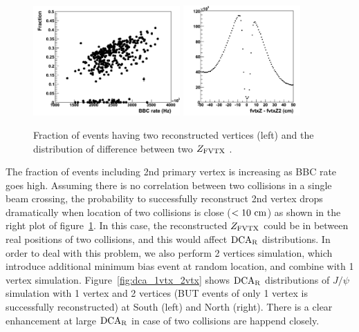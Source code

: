 \documentclass[12pt]{article}
\newcommand{\jpsi}{$J/\psi$ }
\newcommand{\dcar}{$\rm{DCA}_{R}$ }
\newcommand{\fvtxz}{$Z_{\rm FVTX}$ }
\begin{document}
\begin{figure}[!h]
\begin{center}
\includegraphics[width=0.5\textwidth,angle=0]{figures/Fraction_2nd_vertex_BBCrate}
\includegraphics[width=0.4\textwidth,angle=0]{figures/FvtxZ_diff_1st_2nd}
\\ \caption{Fraction of events having two reconstructed vertices (left) and the distribution of difference between two \fvtxz.}
\label{fig:FvtxZ_2nd}
\end{center}
\end{figure}


The fraction of events including 2nd primary vertex is increasing as BBC rate goes high.
Assuming there is no correlation between two collisions in a single beam crossing, the probability to successfully reconstruct 2nd vertex drops dramatically when location of two collisions is close ($<10~{\rm cm}$) as shown in the right plot of figure~\ref{fig:FvtxZ_2nd}.
In this case, the reconstructed \fvtxz could be in between real positions of two collisions, and this would affect \dcar distributions.
In order to deal with this problem, we also perform 2 vertices simulation, which introduce additional minimum bias event at random location, and combine with 1 vertex simulation.
Figure~\ref{fig:dca_1vtx_2vtx} shows \dcar distributions of \jpsi simulation with 1 vertex and 2 vertices (BUT events of only 1 vertex is successfully reconstructed) at South (left) and North (right).
There is a clear enhancement at large \dcar in case of two collisions are happend closely.
\end{document}
